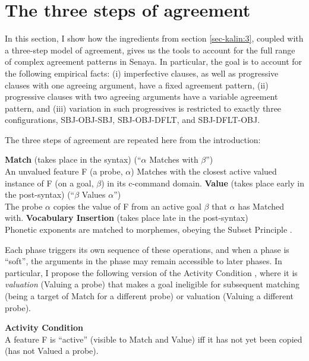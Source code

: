 \documentclass[output=paper
,modfonts
,nonflat]{langsci/langscibook}
\begin{document}
\section{The three steps of agreement} \label{sec-kalin:4}

In this section, I show how the ingredients from section \ref{sec-kalin:3}, coupled with  a three-step model of agreement, gives us the tools to account for the full range of complex agreement patterns in Senaya. In particular, the goal is to account for the following empirical facts: (i) imperfective clauses, as well as progressive clauses with one agreeing argument, have a fixed agreement pattern, (ii) progressive clauses with two agreeing arguments have a variable agreement pattern, and (iii) variation in such progressives is restricted to exactly three configurations, SBJ-OBJ-SBJ, SBJ-OBJ-DFLT, and SBJ-DFLT-OBJ. 

The three steps of agreement are repeated here from the introduction:

\eal \label{OPS2}
\ex \textbf{Match} {(takes place in the syntax)} \- \hfill (``{$\alpha$} Matches with {$\beta$}'')\\
An unvalued feature F (a probe, {$\alpha$}) Matches with the closest active valued instance of F (on a goal, {$\beta$}) in its c-command domain.
\ex \textbf{Value} (takes place early in the post-syntax) \- \hfill (``{$\beta$} Values {$\alpha$}'')\\
The probe {$\alpha$} copies the value of F from an active goal {$\beta$} that {$\alpha$} has Matched with.
\ex \textbf{Vocabulary Insertion} (takes place late in the post-syntax)\\
Phonetic exponents are matched to morphemes, obeying the Subset Principle \citep{Halle97}.
\zl

\noindent Each phase triggers its own sequence of these operations, and when a phase is ``soft'', the arguments in the phase may remain accessible to later phases. In particular, I propose the following version of the Activity Condition \citep{Chomsky01}, where it is \textit{valuation} (Valuing a probe) that makes a goal ineligible for subsequent matching (being a target of Match for a different probe) or valuation (Valuing a different probe).

\ea \textbf{Activity Condition}\\A feature F is ``active'' (visible to Match and Value) iff it has not yet been copied (has not Valued a probe).\label{AC2}
\z
\end{document}
